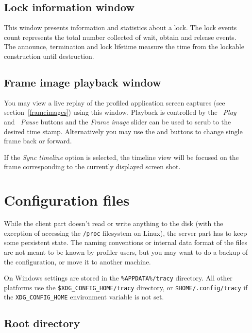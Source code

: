 \documentclass[hidelinks,titlepage,a4paper]{article}
\begin{document}
\subsection{Lock information window}
\label{lockwindow}

This window presents information and statistics about a lock. The lock events count represents the total number collected of wait, obtain and release events. The announce, termination and lock lifetime measure the time from the lockable construction until destruction.

\subsection{Frame image playback window}
\label{playback}

You may view a live replay of the profiled application screen captures (see section~\ref{frameimages}) using this window. Playback is controlled by the \emph{\faPlay~Play} and \emph{\faPause~Pause} buttons and the \emph{Frame image} slider can be used to scrub to the desired time stamp. Alternatively you may use the \emph{\faCaretLeft} and \emph{\faCaretRight} buttons to change single frame back or forward.

If the \emph{Sync timeline} option is selected, the timeline view will be focused on the frame corresponding to the currently displayed screen shot.

\section{Configuration files}

While the client part doesn't read or write anything to the disk (with the exception of accessing the \texttt{/proc} filesystem on Linux), the server part has to keep some persistent state. The naming conventions or internal data format of the files are not meant to be known by profiler users, but you may want to do a backup of the configuration, or move it to another machine.

On Windows settings are stored in the \texttt{\%APPDATA\%/tracy} directory. All other platforms use the \texttt{\$XDG\_CONFIG\_HOME/tracy} directory, or \texttt{\$HOME/.config/tracy} if the \texttt{XDG\_CONFIG\_HOME} environment variable is not set.

\subsection{Root directory}
\end{document}
